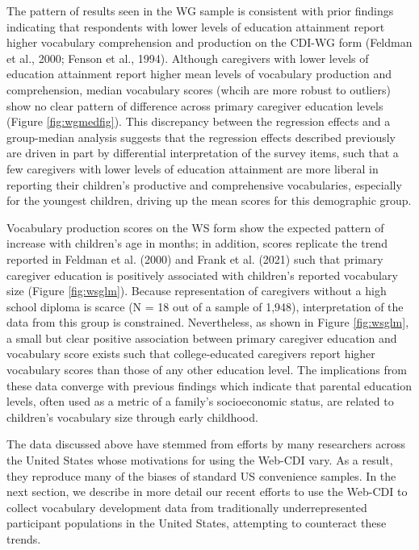 \documentclass[
  english,
  ,man,floatsintext]{apa6}
\begin{document}
The pattern of results seen in the WG sample is consistent with prior findings indicating that respondents with lower levels of education attainment report higher vocabulary comprehension and production on the CDI-WG form (Feldman et al., 2000; Fenson et al., 1994). Although caregivers with lower levels of education attainment report higher mean levels of vocabulary production and comprehension, median vocabulary scores (whcih are more robust to outliers) show no clear pattern of difference across primary caregiver education levels (Figure \ref{fig:wgmedfig}). This discrepancy between the regression effects and a group-median analysis suggests that the regression effects described previously are driven in part by differential interpretation of the survey items, such that a few caregivers with lower levels of education attainment are more liberal in reporting their children's productive and comprehensive vocabularies, especially for the youngest children, driving up the mean scores for this demographic group.

Vocabulary production scores on the WS form show the expected pattern of increase with children's age in months; in addition, scores replicate the trend reported in Feldman et al. (2000) and Frank et al. (2021) such that primary caregiver education is positively associated with children's reported vocabulary size (Figure \ref{fig:wsglm}). Because representation of caregivers without a high school diploma is scarce (N = 18 out of a sample of 1,948), interpretation of the data from this group is constrained. Nevertheless, as shown in Figure \ref{fig:wsglm}, a small but clear positive association between primary caregiver education and vocabulary score exists such that college-educated caregivers report higher vocabulary scores than those of any other education level. The implications from these data converge with previous findings which indicate that parental education levels, often used as a metric of a family's socioeconomic status, are related to children's vocabulary size through early childhood.

The data discussed above have stemmed from efforts by many researchers across the United States whose motivations for using the Web-CDI vary. As a result, they reproduce many of the biases of standard US convenience samples. In the next section, we describe in more detail our recent efforts to use the Web-CDI to collect vocabulary development data from traditionally underrepresented participant populations in the United States, attempting to counteract these trends.
\end{document}

